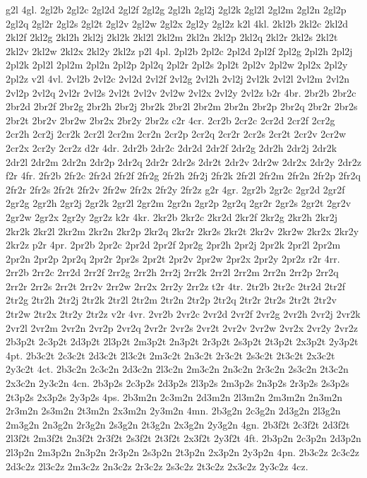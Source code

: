 {g2l 4gl. 2gl2b 2gl2c 2gl2d 2gl2f 2gl2g 2gl2h 2gl2j 2gl2k 2gl2l 2gl2m 2gl2n 2gl2p 2gl2q 2gl2r 2gl2s 2gl2t 2gl2v 2gl2w 2gl2x 2gl2y 2gl2z
k2l 4kl. 2kl2b 2kl2c 2kl2d 2kl2f 2kl2g 2kl2h 2kl2j 2kl2k 2kl2l 2kl2m 2kl2n 2kl2p 2kl2q 2kl2r 2kl2s 2kl2t 2kl2v 2kl2w 2kl2x 2kl2y 2kl2z
p2l 4pl. 2pl2b 2pl2c 2pl2d 2pl2f 2pl2g 2pl2h 2pl2j 2pl2k 2pl2l 2pl2m 2pl2n 2pl2p 2pl2q 2pl2r 2pl2s 2pl2t 2pl2v 2pl2w 2pl2x 2pl2y 2pl2z
v2l 4vl. 2vl2b 2vl2c 2vl2d 2vl2f 2vl2g 2vl2h 2vl2j 2vl2k 2vl2l 2vl2m 2vl2n 2vl2p 2vl2q 2vl2r 2vl2s 2vl2t 2vl2v 2vl2w 2vl2x 2vl2y 2vl2z
b2r 4br. 2br2b 2br2c 2br2d 2br2f 2br2g 2br2h 2br2j 2br2k 2br2l 2br2m 2br2n 2br2p 2br2q 2br2r 2br2s 2br2t 2br2v 2br2w 2br2x 2br2y 2br2z
c2r 4cr. 2cr2b 2cr2c 2cr2d 2cr2f 2cr2g 2cr2h 2cr2j 2cr2k 2cr2l 2cr2m 2cr2n 2cr2p 2cr2q 2cr2r 2cr2s 2cr2t 2cr2v 2cr2w 2cr2x 2cr2y 2cr2z
d2r 4dr. 2dr2b 2dr2c 2dr2d 2dr2f 2dr2g 2dr2h 2dr2j 2dr2k 2dr2l 2dr2m 2dr2n 2dr2p 2dr2q 2dr2r 2dr2s 2dr2t 2dr2v 2dr2w 2dr2x 2dr2y 2dr2z
f2r 4fr. 2fr2b 2fr2c 2fr2d 2fr2f 2fr2g 2fr2h 2fr2j 2fr2k 2fr2l 2fr2m 2fr2n 2fr2p 2fr2q 2fr2r 2fr2s 2fr2t 2fr2v 2fr2w 2fr2x 2fr2y 2fr2z
g2r 4gr. 2gr2b 2gr2c 2gr2d 2gr2f 2gr2g 2gr2h 2gr2j 2gr2k 2gr2l 2gr2m 2gr2n 2gr2p 2gr2q 2gr2r 2gr2s 2gr2t 2gr2v 2gr2w 2gr2x 2gr2y 2gr2z
k2r 4kr. 2kr2b 2kr2c 2kr2d 2kr2f 2kr2g 2kr2h 2kr2j 2kr2k 2kr2l 2kr2m 2kr2n 2kr2p 2kr2q 2kr2r 2kr2s 2kr2t 2kr2v 2kr2w 2kr2x 2kr2y 2kr2z
p2r 4pr. 2pr2b 2pr2c 2pr2d 2pr2f 2pr2g 2pr2h 2pr2j 2pr2k 2pr2l 2pr2m 2pr2n 2pr2p 2pr2q 2pr2r 2pr2s 2pr2t 2pr2v 2pr2w 2pr2x 2pr2y 2pr2z
r2r 4rr. 2rr2b 2rr2c 2rr2d 2rr2f 2rr2g 2rr2h 2rr2j 2rr2k 2rr2l 2rr2m 2rr2n 2rr2p 2rr2q 2rr2r 2rr2s 2rr2t 2rr2v 2rr2w 2rr2x 2rr2y 2rr2z
t2r 4tr. 2tr2b 2tr2c 2tr2d 2tr2f 2tr2g 2tr2h 2tr2j 2tr2k 2tr2l 2tr2m 2tr2n 2tr2p 2tr2q 2tr2r 2tr2s 2tr2t 2tr2v 2tr2w 2tr2x 2tr2y 2tr2z
v2r 4vr. 2vr2b 2vr2c 2vr2d 2vr2f 2vr2g 2vr2h 2vr2j 2vr2k 2vr2l 2vr2m 2vr2n 2vr2p 2vr2q 2vr2r 2vr2s 2vr2t 2vr2v 2vr2w 2vr2x 2vr2y 2vr2z
2b3p2t 2c3p2t 2d3p2t 2l3p2t 2m3p2t 2n3p2t 2r3p2t 2s3p2t 2t3p2t 2x3p2t 2y3p2t 4pt.
2b3c2t 2c3c2t 2d3c2t 2l3c2t 2m3c2t 2n3c2t 2r3c2t 2s3c2t 2t3c2t 2x3c2t 2y3c2t 4ct.
2b3c2n 2c3c2n 2d3c2n 2l3c2n 2m3c2n 2n3c2n 2r3c2n 2s3c2n 2t3c2n 2x3c2n 2y3c2n 4cn.
2b3p2s 2c3p2s 2d3p2s 2l3p2s 2m3p2s 2n3p2s 2r3p2s 2s3p2s 2t3p2s 2x3p2s 2y3p2s 4ps.
2b3m2n 2c3m2n 2d3m2n 2l3m2n 2m3m2n 2n3m2n 2r3m2n 2s3m2n 2t3m2n 2x3m2n 2y3m2n 4mn.
2b3g2n 2c3g2n 2d3g2n 2l3g2n 2m3g2n 2n3g2n 2r3g2n 2s3g2n 2t3g2n 2x3g2n 2y3g2n 4gn.
2b3f2t 2c3f2t 2d3f2t 2l3f2t 2m3f2t 2n3f2t 2r3f2t 2s3f2t 2t3f2t 2x3f2t 2y3f2t 4ft.
2b3p2n 2c3p2n 2d3p2n 2l3p2n 2m3p2n 2n3p2n 2r3p2n 2s3p2n 2t3p2n 2x3p2n 2y3p2n 4pn.
2b3c2z 2c3c2z 2d3c2z 2l3c2z 2m3c2z 2n3c2z 2r3c2z 2s3c2z 2t3c2z 2x3c2z 2y3c2z 4cz.
}
